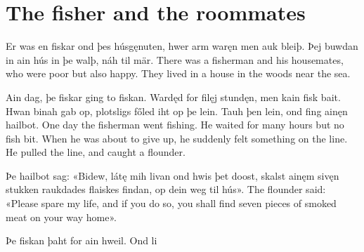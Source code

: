 \section{The fisher and the roommates}


\begin{paracol}{2}
Er was en fiskar ond þes húsgęnuten, hwer arm waręn men auk bleiþ.
Þej buwdan in ain hús in þe walþ, náh til mär.
\switchcolumn
There was a fisherman and his housemates, who were poor but also happy. They lived in a house in the woods near the sea.
\end{paracol}

\begin{paracol}{2}
Ain dag, þe fiskar ging to fiskan. Wardęd for filęj stundęn, men kain fisk bait. Hwan binah gab op, plotsligs főled iht op þe lein. Tauh þen lein, ond fing ainęn hailbot.
\switchcolumn
One day the fisherman went fishing. He waited for many hours but no fish bit. When he was about to give up, he suddenly felt something on the line. He pulled the line, and caught a flounder.
\end{paracol}

\begin{paracol}{2}
Þe hailbot sag: «Bidew, látę mih livan ond hwis þet doost, skalst ainęm sivęn stukken raukdades flaiskes findan, op dein weg til hús».
\switchcolumn
The flounder said: «Please spare my life, and if you do so, you shall find seven pieces of smoked meat on your way home».
\end{paracol}

\begin{paracol}{2}
Þe fiskan þaht for ain hweil. Ond li
\switchcolumn

\end{paracol}
